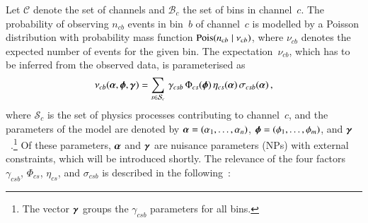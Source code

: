 Let $\mathcal{C}$ denote the set of channels and $\mathcal{B}_{c}$ the set of
bins in channel~$c$. The probability of observing $n_{cb}$ events in bin~$b$ of
channel~$c$ is modelled by a Poisson distribution with probability mass function
$\operatorname{Pois}(n_{cb} \mid \nu_{cb})$, where $\nu_{cb}$ denotes the expected number of
events for the given bin. The expectation~$\nu_{cb}$, which has to be inferred
from the observed data, is parameterised as
\begin{align*}
  \nu_{cb}(\myvec{\alpha}, \myvec{\phi}, \myvec{\gamma}) =
  \sum_{s \in \mathcal{S}_{c}} \, \gamma_{csb} \, \Phi_{cs}(\myvec{\phi}) \, \eta_{cs}(\myvec{\alpha}) \, \sigma_{csb}(\myvec{\alpha}) \,\text{,}
\end{align*}
where $\mathcal{S}_{c}$ is the set of physics processes contributing to
channel~$c$, and the parameters of the model are denoted by
${\myvec{\alpha} = (\alpha_1, \dots, \alpha_n)}$,
${\myvec{\phi} = (\phi_1, \dots, \phi_m)}$, and
$\myvec{\gamma}$~\cite{cranmer2012}.\footnote{The vector $\myvec{\gamma}$ groups
  the $\gamma_{csb}$ parameters for all bins.} Of these parameters,
$\myvec{\alpha}$ and $\myvec{\gamma}$ are nuisance parameters (NPs) with
external constraints, which will be introduced shortly.  The relevance of the
four factors $\gamma_{csb}$, $\Phi_{cs}$, $\eta_{cs}$, and $\sigma_{csb}$ is
described in the following~\cite{cranmer2012}:
